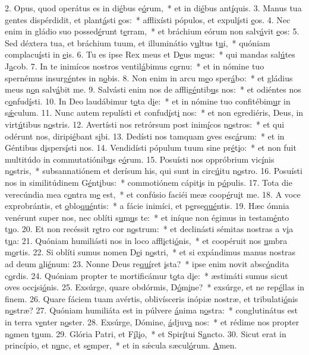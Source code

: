 2. Opus, quod operátus es in di\uline{é}bus e\uline{ó}rum,~* et in di\uline{é}bus ant\uline{í}quis.
3. Manus tua gentes dispérdidit, et plant\uline{á}sti \uline{e}os:~* afflixísti pópulos, et expul\uline{í}sti \uline{e}os.
4. Nec enim in gládio suo possed\uline{é}runt t\uline{e}rram,~* et bráchium eórum non salv\uline{á}vit \uline{e}os:
5. Sed déxtera tua, et bráchium tuum, et illuminátio v\uline{u}ltus t\uline{u}i,~* quóniam complacu\uline{í}sti in \uline{e}is.
6. Tu es ipse Rex meus et D\uline{e}us m\uline{e}us:~* qui mandas sal\uline{ú}tes J\uline{a}cob.
7. In te inimícos nostros ventil\uline{á}bimus c\uline{o}rnu:~* et in nómine tuo spernémus insurg\uline{é}ntes in n\uline{o}bis.
8. Non enim in arcu m\uline{e}o sper\uline{á}bo:~* et gládius meus n\uline{o}n salv\uline{á}bit me.
9. Salvásti enim nos de afflig\uline{é}ntib\uline{u}s nos:~* et odiéntes nos c\uline{o}nfud\uline{í}sti.
10. In Deo laudábimur t\uline{o}ta d\uline{i}e:~* et in nómine tuo confitébim\uline{u}r in s\uline{ǽ}culum.
11. Nunc autem repulísti et confud\uline{í}st\uline{i} nos:~* et non egrediéris, Deus, in virt\uline{ú}tibus n\uline{o}stris.
12. Avertísti nos retrórsum post inim\uline{í}cos n\uline{o}stros:~* et qui odérunt nos, diripi\uline{é}bant s\uline{i}bi.
13. Dedísti nos tamquam \uline{o}ves esc\uline{á}rum:~* et in Géntibus d\uline{i}spers\uline{í}sti nos.
14. Vendidísti pópulum tuum sine pr\uline{é}t\uline{i}o:~* et non fuit multitúdo in commutatiónib\uline{u}s e\uline{ó}rum.
15. Posuísti nos oppróbrium vic\uline{í}nis n\uline{o}stris,~* subsannatiónem et derísum his, qui sunt in circ\uline{ú}itu n\uline{o}stro.
16. Posuísti nos in similitúdinem G\uline{é}nt\uline{i}bus:~* commotiónem cápit\uline{i}s in p\uline{ó}pulis.
17. Tota die verecúndia mea c\uline{o}ntra m\uline{e} est,~* et confúsio faciéi meæ coop\uline{é}ru\uline{i}t me.
18. A voce exprobrántis, et \uline{o}blo\uline{qué}ntis:~* a fácie inimíci, et p\uline{e}rse\uline{qué}ntis.
19. Hæc ómnia venérunt super nos, nec oblíti s\uline{u}m\uline{u}s te:~* et iníque non égimus in testam\uline{é}nto t\uline{u}o.
20. Et non recéssit r\uline{e}tro cor n\uline{o}strum:~* et declinásti sémitas nostras a v\uline{i}a t\uline{u}a:
21. Quóniam humiliásti nos in loco affl\uline{i}cti\uline{ó}nis,~* et coopéruit nos \uline{u}mbra m\uline{o}rtis.
22. Si oblíti sumus nomen D\uline{e}i n\uline{o}stri,~* et si expándimus manus nostras ad deum \uline{a}li\uline{é}num:
23. Nonne Deus re\uline{quí}ret \uline{i}sta?~* ipse enim novit absc\uline{ó}ndita c\uline{o}rdis.
24. Quóniam propter te mortificámur t\uline{o}ta d\uline{i}e:~* æstimáti sumus sicut oves occ\uline{i}si\uline{ó}nis.
25. Exsúrge, quare obdórmis, D\uline{ó}m\uline{i}ne?~* exsúrge, et ne rep\uline{é}llas in f\uline{i}nem.
26. Quare fáciem tuam avértis, oblivísceris inópiæ nostræ, et tribulati\uline{ó}nis n\uline{o}stræ?
27. Quóniam humiliáta est in púlvere \uline{á}nima n\uline{o}stra:~* conglutinátus est in terra v\uline{e}nter n\uline{o}ster.
28. Exsúrge, Dómine, \uline{á}djuv\uline{a} nos:~* et rédime nos propter n\uline{o}men t\uline{u}um.
29. Glória Patri, et F\uline{í}l\uline{i}o,~* et Spir\uline{í}tui S\uline{a}ncto.
30. Sicut erat in princípio, et n\uline{u}nc, et s\uline{e}mper,~* et in sǽcula sæcul\uline{ó}rum. \uline{A}men.

